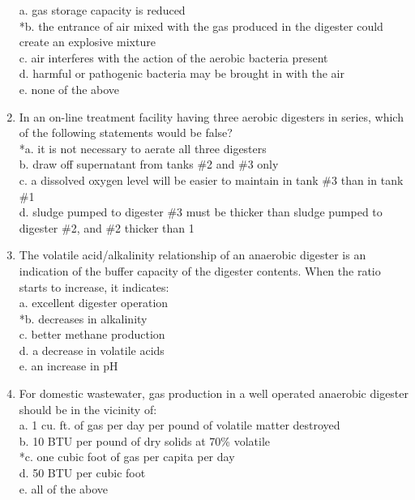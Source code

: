 \documentclass{article}
\begin{document}
\begin{enumerate}
a. gas storage capacity is reduced \\
*b. the entrance of air mixed with the gas produced in the digester could create an explosive mixture \\
c. air interferes with the action of the aerobic bacteria present \\
d. harmful or pathogenic bacteria may be brought in with the air \\
e. none of the above \\

\item  In an on-line treatment facility having three aerobic digesters in series, which of the following statements would be false? \\

*a. it is not necessary to aerate all three digesters \\
b. draw off supernatant from tanks \#2 and \#3 only \\
c. a dissolved oxygen level will be easier to maintain in tank \#3 than in tank \#1 \\
d. sludge pumped to digester \#3 must be thicker than sludge pumped to digester \#2, and \#2 thicker than 1 \\

\item  The volatile acid/alkalinity relationship of an anaerobic digester is an indication of the buffer capacity of the digester contents. When the ratio starts to increase, it indicates: \\

a. excellent digester operation \\
*b. decreases in alkalinity \\
c. better methane production \\
d. a decrease in volatile acids \\
e. an increase in pH \\

\item  For domestic wastewater, gas production in a well operated anaerobic digester should be in the vicinity of: \\

a. 1 cu. ft. of gas per day per pound of volatile matter destroyed \\
b. 10 BTU per pound of dry solids at 70\% volatile \\
*c. one cubic foot of gas per capita per day \\
d. 50 BTU per cubic foot \\
e. all of the above \\


\end{enumerate}
\end{document}

